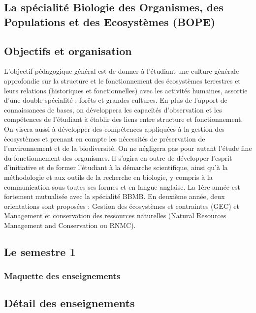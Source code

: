 \documentclass[10pt, a5paper]{report}
\begin{document}
\begin{spacing}{1.5}
\section*{La spécialité Biologie des Organismes, des Populations et des Ecosystèmes (BOPE) }



\subsection*{Objectifs et organisation}

L’objectif pédagogique général est de donner à l’étudiant une culture générale approfondie sur la structure et le fonctionnement des écosystèmes terrestres et leurs relations (historiques et fonctionnelles) avec les activités humaines, assortie d’une double spécialité : forêts et grandes cultures. En plus de l’apport de connaissances de bases, on développera les capacités d’observation et les compétences de l’étudiant à établir des liens entre structure et fonctionnement. On visera aussi à développer des compétences appliquées à la gestion des écosystèmes et prenant en compte les nécessités de préservation de l’environnement et de la biodiversité.  On ne négligera pas pour autant l’étude fine du fonctionnement des organismes. Il s’agira en outre de développer l’esprit d’initiative et de former l’étudiant à la démarche scientifique, ainsi qu’à la méthodologie et aux outils de la recherche en biologie, y compris à la communication sous toutes ses formes et en langue anglaise.
La 1ère année est fortement mutualisée avec la spécialité BBMB. En deuxième année, deux orientations sont proposées : Gestion des écosystèmes et contraintes (GEC) et Management et conservation des ressources naturelles (Natural Resources Management and Conservation ou RNMC).


%

\newpage

\subsection*{Le semestre 1}

\subsubsection*{Maquette des enseignements}



\subsection*{Détail des enseignements}


\end{spacing}
\end{document}
